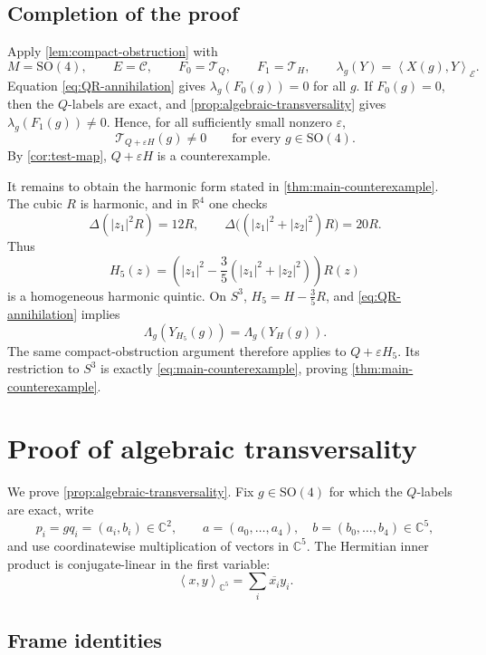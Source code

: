 \documentclass[11pt,reqno]{amsart}
\theoremstyle{definition}
\theoremstyle{remark}
\newcommand{\R}{\mathbb R}
\newcommand{\C}{\mathbb C}
\newcommand{\SO}{\mathrm{SO}}
\newcommand{\eps}{\varepsilon}
\newcommand{\cE}{\mathcal E}
\newcommand{\cC}{\mathcal C}
\newcommand{\cT}{\mathcal T}
\newcommand{\ip}[2]{\left\langle #1,#2\right\rangle}
\newcommand{\abs}[1]{\left\lvert #1\right\rvert}
\begin{document}
\subsection{Completion of the proof}

Apply \cref{lem:compact-obstruction} with
\[
M=\SO(4),\qquad E=\cC,
\qquad F_0=\cT_Q,\qquad F_1=\cT_H,
\qquad \lambda_g(Y)=\ip{X(g)}{Y}_{\cE}.
\]
Equation \eqref{eq:QR-annihilation} gives
$\lambda_g(F_0(g))=0$ for all $g$.  If $F_0(g)=0$, then the $Q$-labels are
exact, and \cref{prop:algebraic-transversality} gives
$\lambda_g(F_1(g))\ne0$.  Hence, for all sufficiently small nonzero $\eps$,
\[
\cT_{Q+\eps H}(g)\ne0\qquad\text{for every }g\in\SO(4).
\]
By \cref{cor:test-map}, $Q+\eps H$ is a counterexample.

It remains to obtain the harmonic form stated in
\cref{thm:main-counterexample}.  The cubic $R$ is harmonic, and in $\R^4$ one
checks
\[
\Delta(\abs{z_1}^2R)=12R,
\qquad
\Delta\bigl((\abs{z_1}^2+\abs{z_2}^2)R\bigr)=20R.
\]
Thus
\begin{equation}\label{eq:harmonic-quintic}
H_5(z)=
\left(\abs{z_1}^2-\frac35(\abs{z_1}^2+\abs{z_2}^2)\right)R(z)
\end{equation}
is a homogeneous harmonic quintic.  On $S^3$,
$H_5=H-\frac35R$, and \eqref{eq:QR-annihilation} implies
\[
\Lambda_g(Y_{H_5}(g))=\Lambda_g(Y_H(g)).
\]
The same compact-obstruction argument therefore applies to $Q+\eps H_5$.
Its restriction to $S^3$ is exactly \eqref{eq:main-counterexample}, proving
\cref{thm:main-counterexample}.

\appendix

\section{Proof of algebraic transversality}\label{app:transversality}

We prove \cref{prop:algebraic-transversality}.  Fix $g\in\SO(4)$ for which the
$Q$-labels are exact, write
\[
p_i=gq_i=(a_i,b_i)\in\C^2,
\qquad
a=(a_0,\dots,a_4),\quad b=(b_0,\dots,b_4)\in\C^5,
\]
and use coordinatewise multiplication of vectors in $\C^5$.  The Hermitian
inner product is conjugate-linear in the first variable:
\[
\ip{x}{y}_{\C^5}=\sum_i\overline{x_i}y_i.
\]

\subsection{Frame identities}
\end{document}
